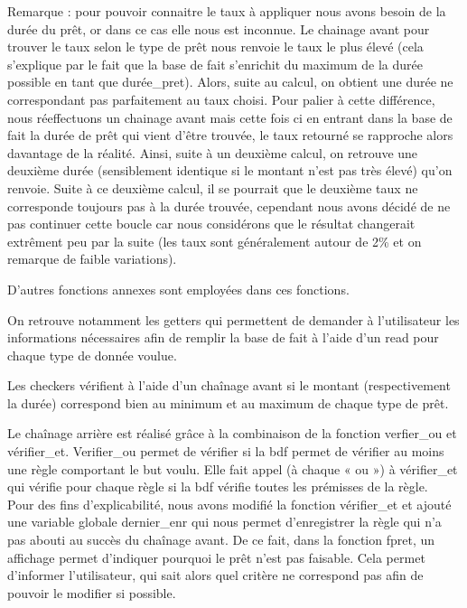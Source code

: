 \documentclass[
]{article}
\begin{document}
Remarque : pour pouvoir connaitre le taux à appliquer nous avons 
besoin de la durée du prêt, or dans ce cas elle nous 
est inconnue. Le chainage avant pour trouver le taux 
selon le type de prêt nous renvoie le taux le plus 
élevé (cela s'explique par le fait que la base de fait 
s'enrichit du maximum de la durée possible en tant que 
durée\_pret). Alors, suite au calcul, on obtient une 
durée ne correspondant pas parfaitement au taux choisi. 
Pour palier à cette différence, nous réeffectuons un 
chainage avant mais cette fois ci en entrant dans la 
base de fait la durée de prêt qui vient d'être trouvée, 
le taux retourné se rapproche alors davantage de la 
réalité. Ainsi, suite à un deuxième calcul, on retrouve 
une deuxième durée (sensiblement identique si le montant 
n'est pas très élevé) qu'on renvoie. Suite à ce 
deuxième calcul, il se pourrait que le deuxième taux 
ne corresponde toujours pas à la durée trouvée, 
cependant nous avons décidé de ne pas continuer 
cette boucle car nous considérons que le résultat 
changerait extrêment peu par la suite (les taux sont 
généralement autour de 2\% et on remarque de faible 
variations). 

\pagebreak

D'autres fonctions annexes sont employées dans ces fonctions.

On retrouve notamment les getters qui permettent de demander à
l'utilisateur les informations nécessaires afin de remplir la base de
fait à l'aide d'un read pour chaque type de donnée voulue.

Les checkers vérifient à l'aide d'un chaînage avant si le montant
(respectivement la durée) correspond bien au minimum et au maximum de
chaque type de prêt.

Le chaînage arrière est réalisé grâce à la combinaison de la fonction
verfier\_ou et vérifier\_et. Verifier\_ou permet de vérifier si la bdf
permet de vérifier au moins une règle comportant le but voulu. Elle fait
appel (à chaque « ou ») à vérifier\_et qui vérifie pour chaque règle si
la bdf vérifie toutes les prémisses de la règle.\\
Pour des fins d'explicabilité, nous avons modifié la fonction
vérifier\_et et ajouté une variable globale dernier\_enr qui nous permet
d'enregistrer la règle qui n'a pas abouti au succès du chaînage avant.
De ce fait, dans la fonction fpret, un affichage permet d'indiquer
pourquoi le prêt n'est pas faisable. Cela permet d'informer
l'utilisateur, qui sait alors quel critère ne correspond pas afin de
pouvoir le modifier si possible.
\end{document}

